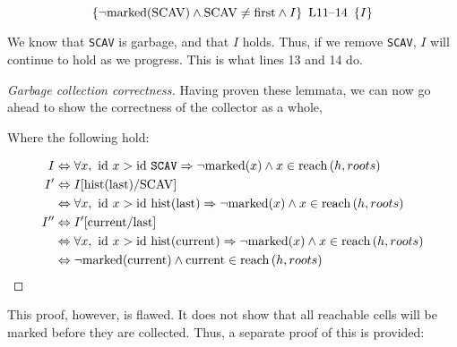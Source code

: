 \begin{lemma}
  \label{lem:erlang2}
  \[\htriple{\lnot\mathrm{marked}(\mathrm{SCAV}) \land \mathrm{SCAV}
    \neq \mathrm{first} \land I}{L11--14}{I}\]

  We know that \texttt{SCAV} is garbage, and that $I$ holds. Thus, if
  we remove \texttt{SCAV}, $I$ will continue to hold as we
  progress. This is what lines 13 and 14 do.
\end{lemma}

\begin{proof}[Garbage collection correctness]
  Having proven these lemmata, we can now go ahead to show the
  correctness of the collector as a whole,

  \begin{prooftree}



  \end{prooftree}

  Where the following hold:

  \begin{align*}
    I &\iff \forall x,\ \id~x > \id~\mathtt{SCAV} \implies \lnot
       \mathrm{marked}(x) \land x \in \reach{h}{roots}\\
    I' &\iff I[\mathrm{hist}(\mathrm{last})/\mathrm{SCAV}]\\
    &\iff \forall x,\ \id~x > \id~\mathrm{hist}(\mathrm{last})
      \implies \lnot \mathrm{marked}(x) \land x \in \reach{h}{roots}\\
    I'' &\iff I'[\mathrm{current}/\mathrm{last}]\\
    &\iff \forall x,\ \id~x > \id~\mathtt{\mathrm{hist}(\mathrm{current})} \implies \lnot
       \mathrm{marked}(x) \land x \in \reach{h}{roots}\\
    &\iff \lnot\mathrm{marked}(\mathrm{current}) \land \mathrm{current}
       \in \reach{h}{roots}
  \end{align*}
\end{proof}

This proof, however, is flawed. It does not show that all reachable
cells will be marked before they are collected. Thus, a separate proof
of this is provided:

